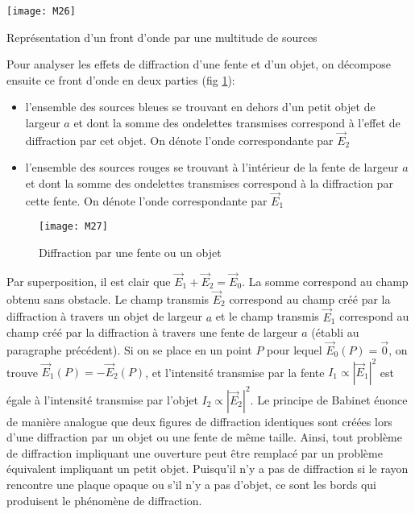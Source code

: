 \begin{marginfigure}[0cm]
\texttt{[image: M26]}
\caption{Représentation d'un front d'onde par une multitude de sources}
\label{f4}
\end{marginfigure}

\noindent Pour analyser les effets de diffraction d'une fente et d'un objet, on décompose ensuite ce front d'onde en deux parties (fig \ref{d2}):
\begin{itemize}
    \item l'ensemble des sources bleues se trouvant en dehors d'un petit objet de largeur $a$ et dont la somme des ondelettes transmises correspond à l'effet de diffraction par cet objet. On dénote l'onde correspondante par $\overset\rightarrow{E}_2$
    \item l'ensemble des sources rouges se trouvant à l'intérieur de la fente de largeur $a$ et dont la somme des ondelettes transmises correspond à la diffraction par cette fente. On dénote l'onde correspondante par $\overset\rightarrow{E}_1$
\end{itemize}

\begin{figure}[h]
    \centering
    \texttt{[image: M27]}
    \caption{Diffraction par une fente ou un objet}
    \label{d2}
\end{figure}

\noindent Par superposition, il est clair que $\overset\rightarrow{E}_1+\overset\rightarrow{E}_2=\overset\rightarrow{E}_0$. La somme correspond au champ obtenu sans obstacle. Le champ transmis $\overset\rightarrow{E}_2$ correspond au champ créé par la diffraction à travers un objet de largeur $a$ et le champ transmis $\overset\rightarrow{E}_1$ correspond au champ créé par la diffraction à travers une fente de largeur $a$ (établi au paragraphe précédent).
Si on se place en un point $P$ pour lequel $\overset\rightarrow{E}_0(P)=\overset\rightarrow{0}$, on trouve $\overset\rightarrow{E}_1(P)=-\overset\rightarrow{E}_2(P)$, et l'intensité transmise par la fente $I_1\propto |\overset\rightarrow{E}_1|^2$ est égale à l'intensité transmise par l'objet $I_2\propto |\overset\rightarrow{E}_2|^2$. Le principe de Babinet énonce de manière analogue que deux figures de diffraction identiques sont créées lors d'une diffraction par un objet ou une fente de même taille. Ainsi, tout problème de diffraction impliquant une ouverture peut être remplacé par un problème équivalent impliquant un petit objet. Puisqu'il n'y a pas de diffraction si le rayon rencontre une plaque opaque ou s'il n'y a pas d'objet, ce sont les bords qui produisent le phénomène de diffraction.

